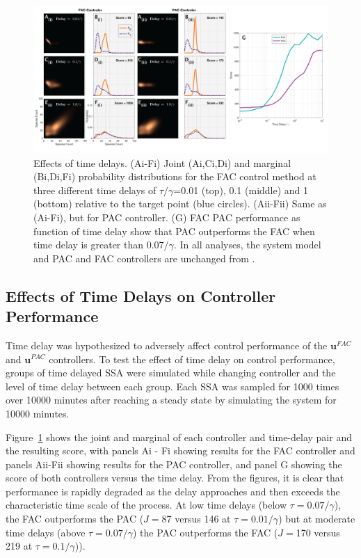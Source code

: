 \documentclass[12pt]{article}
\begin{document}
\begin{figure}
\begin{center}
\includegraphics[width=1\textwidth]{TimeDelayPerturbation.png}
\vspace{-0.1in}
\caption{Effects of time delays. (Ai-Fi) Joint (Ai,Ci,Di) and marginal (Bi,Di,Fi) probability distributions for the FAC control method at three different time delays of $\tau/\gamma$=0.01 (top), 0.1 (middle) and 1 (bottom) relative to the target point (blue circles). (Aii-Fii) Same as (Ai-Fi), but for PAC controller. (G) FAC PAC performance as function of time delay show that PAC outperforms the FAC when time delay is greater than $0.07 /\gamma$. In all analyses, the system model and PAC and FAC controllers are unchanged from \cite{May2021}.}
\label{Time}
\end{center}
\vspace{-0.2in}
\end{figure}

\subsection{Effects of Time Delays on Controller Performance}

Time delay was hypothesized to adversely affect control performance of the $\mathbf{u}^{FAC}$ and $\mathbf{u}^{PAC}$ controllers. To test the effect of time delay on control performance, groups of time delayed SSA were simulated while changing controller and the level of time delay between each group. Each SSA was sampled for 1000 times over 10000 minutes after reaching a steady state by simulating the system for 10000 minutes.

Figure\ \ref{Time} shows the joint and marginal of each controller and time-delay pair and the resulting score, with panels Ai - Fi showing results for the FAC controller and panels Aii-Fii showing results for the PAC controller, and panel G showing the score of both controllers versus the time delay. From the figures, it is clear that performance is rapidly degraded as the delay approaches and then exceeds the characteristic time scale of the process. At low time delays (below $\tau = 0.07/\gamma$), the FAC outperforms the PAC ($J=$87 versus 146 at $\tau = 0.01/\gamma$) but at moderate time delays (above $\tau = 0.07/\gamma$) the PAC outperforms the FAC ($J=$170 versus 219 at $\tau = 0.1/\gamma$)). 
\end{document}
